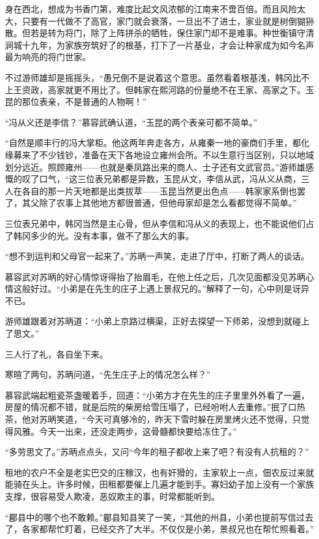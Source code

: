 身在西北，想成为书香门第，难度比起文风浓郁的江南来不啻百倍。而且风险太大，只要有一代做不了高官，家门就会衰落，一旦出不了进士，家业就是树倒猢狲散。但若是转为将门，除了上阵拼杀的牺牲，保住家门却不是难事。种世衡镇守清涧城十九年，为家族夯筑好了的根基，打下了一片基业，才会让种家成为如今名声最为响亮的将门世家。

不过游师雄却是摇摇头，“愚兄倒不是说着这个意思。虽然看着根基浅，韩冈比不上王资政，高家就更不用比了。但韩家在熙河路的份量绝不在王家、高家之下。玉昆的那位表亲，不是普通的人物啊！”

“冯从义还是李信？”慕容武确认道，“玉昆的两个表亲可都不简单。”

“自然是顺丰行的冯大掌柜。他这两年奔走各方，从雍秦一地的豪商们手里，都化缘募来了不少钱钞，准备在天下各地设立雍州会所。不以生意行当区别，只以地域划分远近。照顾雍州——也就是秦凤路出来的商人、士子还有文武官员。”游师雄感慨的叹了口气，“这三位表兄弟都是异数，玉昆从文，李信从武，冯从义从商，三人在各自的那一片天地都是出类拔萃——玉昆当然更出色点——韩家家系倒也罢了，其父除了农事上其他地方都很普通，但他母家却是怎么看都觉得不简单。”

三位表兄弟中，韩冈当然是主心骨，但从李信和冯从义的表现上，也不能说他们占了韩冈多少的光。没有本事，做不了那么大的事。

“想不到运判和父母官一起来了。”苏昞一声笑，走进了厅中，打断了两人的谈话。

慕容武对苏昞的好心情惊讶得抬了抬眉毛，在他上任之后，几次见面都没见苏昞心情这般好过。“小弟是在先生的庄子上遇上景叔兄的。”解释了一句，心中则是讶异不已。

游师雄跟着对苏昞道：“小弟上京路过横渠，正好去探望一下师弟，没想到就碰上了思文。”

三人行了礼，各自坐下来。

寒暄了两句，苏昞问道，“先生庄子上的情况怎么样？”

慕容武端起粗瓷茶盏暖着手，回道：“小弟方才在先生的庄子里里外外看了一遍，房屋的情况都不错，就是后院的柴房给雪压塌了，已经吩咐人去重修。”抿了口热茶，他对苏昞笑道，“今天可真够冷的，昨天下雪时躲在房里烤火还不觉得，只觉得风雅。今天一出来，还没走两步，这骨髓都快要给冻住了。”

“多劳思文了。”苏昞点点头，又问“今年的租子都收上来了吧？有没有人抗租的？”

租地的农户不全是老实巴交的庄稼汉，也有奸猾的，主家软上一点，佃农反过来就能骑在头上。许多时候，田租都要催上几遍才能到手。寡妇幼子加上没有一个家族支撑，很容易受人欺凌，恶奴欺主的事，时常都能听到。

“郿县中的哪个也不敢赖。”郿县知县笑了一笑，“其他的州县，小弟也提前写信过去了，各家都帮忙盯着，已经交齐了大半。不仅仅是小弟，景叔兄也在帮忙照看着。”

